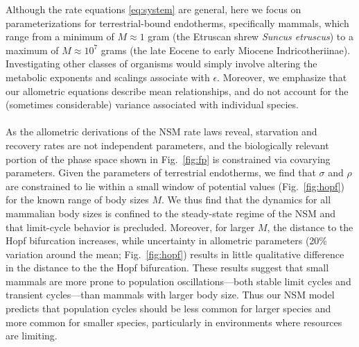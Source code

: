 \documentclass{pnastwo}
\begin{document}
\begin{article}

Although the rate equations \eqref{eq:system} are general, here we focus on
parameterizations for terrestrial-bound endotherms, specifically mammals,
which range from a minimum of $M\approx1$ gram (the Etruscan shrew
\emph{Suncus etruscus}) to a maximum of $M\approx10^7$ grams (the late Eocene
to early Miocene Indricotheriinae).  Investigating other classes of organisms
would simply involve altering the metabolic exponents and scalings associate
with $\epsilon$. Moreover, we emphasize that our allometric equations
describe mean relationships, and do not account for the (sometimes
considerable) variance associated with individual species.
\\

 \\
As the allometric derivations of the NSM rate laws reveal, starvation and
recovery rates are not independent parameters, and the biologically relevant
portion of the phase space shown in Fig.~\ref{fig:fp} is constrained via
covarying parameters.  Given the parameters of terrestrial endotherms, we
find that $\sigma$ and $\rho$ are constrained to lie within a small window of
potential values (Fig.~\ref{fig:hopf}) for the known range of body sizes $M$.
We thus find that the dynamics for all mammalian body sizes is confined to
the steady-state regime of the NSM and that limit-cycle behavior is
precluded.
Moreover, for larger $M$, the distance to the Hopf bifurcation increases,
while uncertainty in allometric parameters (20\% variation around the mean;
Fig.~\ref{fig:hopf}) results in little qualitative difference in the distance
to the the Hopf bifurcation. These results suggest that small mammals are
more prone to population oscillations---both stable limit cycles and
transient cycles---than mammals with larger body size.  Thus our NSM model
predicts that population cycles should be less common for larger species and
more common for smaller species, particularly in environments where resources
are limiting.%


\end{article}
\end{document}
